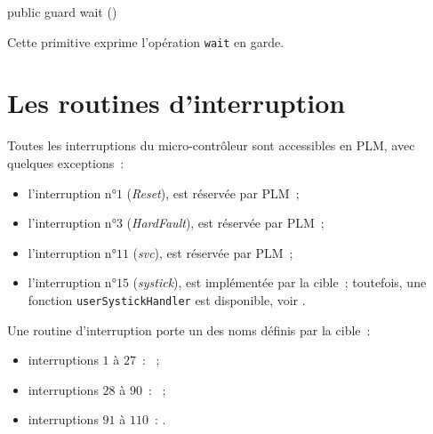 \begin{PLM}
  public guard wait ()
\end{PLM}

Cette primitive exprime l'opération \texttt{wait} en garde.












\section{Les routines d'interruption}

Toutes les interruptions du micro-contrôleur sont accessibles en PLM, avec quelques exceptions~:
\begin{itemize}
  \item l'interruption n°$1$ (\emph{Reset}), est réservée par PLM~;
  \item l'interruption n°$3$ (\emph{HardFault}), est réservée par PLM~;
  \item l'interruption n°$11$ (\emph{svc}), est réservée par PLM~;
  \item l'interruption n°$15$ (\emph{systick}), est implémentée par la cible~; toutefois, une fonction \texttt{userSystickHandler} est disponible, voir .
\end{itemize}

Une routine d'interruption porte un des noms définis par la cible~:
\begin{itemize}
  \item interruptions $1$ à $27$~: ~;
  \item interruptions $28$ à $90$~: ~;
  \item interruptions $91$ à $110$~: .
\end{itemize}






